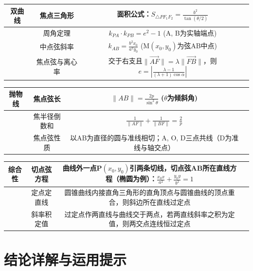 \documentclass{article}
\begin{document}
	\begin{table}[h]
		\centering
		\begin{tabular}{|c|c|c|c|}
			\hline
			\textbf{双曲线} & 焦点三角形 & 面积公式：$S_{\triangle PF_1F_2} = \frac{b^2}{\tan(\theta/2)}$ & \\
			\hline
			& 周角定理 & $k_{PA} \cdot k_{PB} = e^2 - 1$ (A, B为实轴端点) & \\
			\hline
			& 中点弦斜率 & $k_{AB} = \frac{b^2 x_0}{a^2 y_0}$ (M$(x_0,y_0)$为弦AB中点) & \\
			\hline
			& 焦点弦与离心率 & 交于右支且$\|\overrightarrow{AF}\| = \lambda \|\overrightarrow{FB}\|$，则$e=\left|\frac{\lambda-1}{(\lambda+1)\cos\alpha}\right|$ & \\
			\hline
		\end{tabular}
	\end{table}
	
	\begin{table}[h]
		\centering
		\begin{tabular}{|c|c|c|c|}
			\hline
			\textbf{抛物线} & 焦点弦长 & $\|AB\| = \frac{2p}{\sin^2 \theta}$ ($\theta$为倾斜角) & \\
			\hline
			& 焦半径倒数和 & $\frac{1}{\|AF\|} + \frac{1}{\|BF\|} = \frac{2}{p}$ & \\
			\hline
			& 焦点弦性质 & 以AB为直径的圆与准线相切；A, O, D三点共线（D为准线与轴交点） & \\
			\hline
		\end{tabular}
	\end{table}
	
	\begin{table}[h]
		\centering
		\begin{tabular}{|c|c|c|c|}
			\hline
			\textbf{综合性} & 切点弦方程 & 曲线外一点P$(x_0,y_0)$引两条切线，切点弦AB所在直线方程（椭圆为例）：$\frac{x_0 x}{a^2} + \frac{y_0 y}{b^2} = 1$ & \\
			\hline
			& 定点定直线 & 圆锥曲线内接直角三角形的直角顶点与圆锥曲线的顶点重合，则斜边所在直线过定点 & \\
			\hline
			& 斜率积定值 & 过定点作两直线与曲线交于两点，若两直线斜率之积为定值，则两交点连线恒过定点 & \\
			\hline
		\end{tabular}
	\end{table}
	
	\section*{结论详解与运用提示}
	
\end{document}

